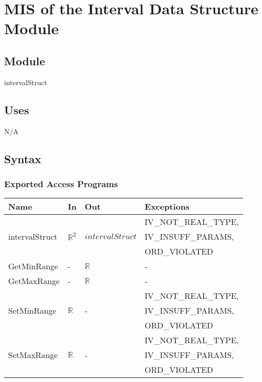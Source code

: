 \documentclass[12pt, titlepage]{article}
\begin{document}
\newpage

\section{MIS of the Interval Data Structure Module} 
\label{Module_intervaldatastructure}

\subsection{Module}

intervalStruct

\subsection{Uses}

N/A

\subsection{Syntax}

\subsubsection{Exported Access Programs}

\begin{center}
	\begin{tabular}{p{3cm} p{3cm} p{3cm} p{5cm}}
		\hline
		\textbf{Name} & \textbf{In} & \textbf{Out} & \textbf{Exceptions} \\
		\hline
		\multirow{3}{3cm}{intervalStruct} & \multirow{3}{3cm}{$\mathbb{R}^2$} & 
		\multirow{3}{4cm}{$intervalStruct$} & 
		IV\_NOT\_REAL\_TYPE, \\
		 &  &  & IV\_INSUFF\_PARAMS, \\
		  &  &  & ORD\_VIOLATED \\
		GetMinRange & - & $\mathbb{R}$ & - \\
		GetMaxRange & - & $\mathbb{R}$ & - \\
		\multirow{3}{3cm}{SetMinRange} & \multirow{3}{3cm}{$\mathbb{R}$} & 
		\multirow{3}{3cm}{-} & IV\_NOT\_REAL\_TYPE, \\
		 &  &  & IV\_INSUFF\_PARAMS, \\
		  &  &  & ORD\_VIOLATED \\
		\multirow{3}{3cm}{SetMaxRange} & \multirow{3}{3cm}{$\mathbb{R}$} & 
		\multirow{3}{3cm}{-} & IV\_NOT\_REAL\_TYPE, \\
		 &  &  & IV\_INSUFF\_PARAMS, \\
		   &  &  & ORD\_VIOLATED \\
		\hline
	\end{tabular}
\end{center}
\end{document}
